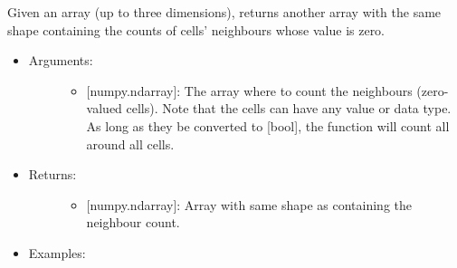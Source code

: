 \documentclass[letterpaper,10pt,english]{sphinxmanual}
\begin{document}
\begin{fulllineitems}
\label{\detokenize{spatial:data_tools.spatial.neighbour_count}}
Given an array (up to three dimensions), returns another array with
the same shape containing the counts of cells’ neighbours whose
value is zero.
\begin{itemize}
\item {} \begin{description}
\item[{Arguments:}] \leavevmode\begin{itemize}
\item {} 
 {[}numpy.ndarray{]}: The array where to count the neighbours
(zero-valued cells). Note that the cells can have any value
or data type. As long as they be converted to {[}bool{]}, the
function will count all  around all  cells.

\end{itemize}

\end{description}

\item {} \begin{description}
\item[{Returns:}] \leavevmode\begin{itemize}
\item {} 
{[}numpy.ndarray{]}: Array with same shape as  containing the
neighbour count.

\end{itemize}

\end{description}

\item {} \begin{description}
\item[{Examples:}] \leavevmode
{}%
\begin{sphinxVerbatim}[commandchars=\\\{\}]
    
\PYG{g+go}{array([[0, 0, 1, 1, 0],}
\PYG{g+go}{       [1, 0, 0, 1, 1]])}
\PYG{g+go}{array([[0, 0, 2, 1, 0],}
\PYG{g+go}{       [2, 0, 0, 2, 1]])}
\end{sphinxVerbatim}


\end{description}
\end{itemize}
\end{fulllineitems}
\end{document}
